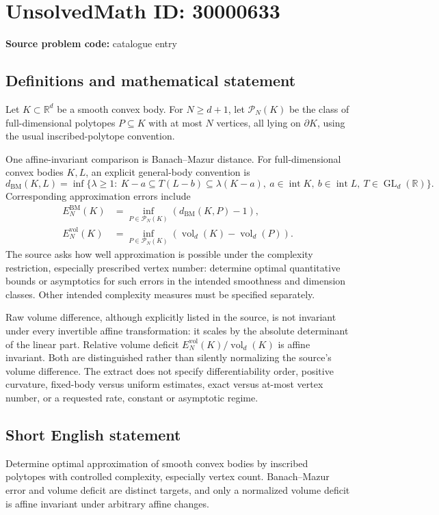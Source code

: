 \documentclass[11pt]{article}
\newcommand{\R}{\mathbb{R}}
\begin{document}
\section*{UnsolvedMath ID: 30000633}
\textbf{Source problem code:} catalogue entry
\subsection{Definitions and mathematical statement}
Let $K\subset\R^d$ be a smooth convex body. For $N\geq d+1$, let $\mathcal P_N(K)$ be the class of full-dimensional polytopes $P\subseteq K$ with at most $N$ vertices, all lying on $\partial K$, using the usual inscribed-polytope convention.

One affine-invariant comparison is Banach--Mazur distance. For full-dimensional convex bodies $K,L$, an explicit general-body convention is
\[
d_{\mathrm{BM}}(K,L)=\inf\{\lambda\geq1:\ K-a\subseteq T(L-b)\subseteq\lambda(K-a),\
 a\in\operatorname{int}K,\ b\in\operatorname{int}L,\ T\in\operatorname{GL}_d(\R)\}.
\]
Corresponding approximation errors include
\[
\begin{aligned}
E_N^{\mathrm{BM}}(K)&=\inf_{P\in\mathcal P_N(K)}(d_{\mathrm{BM}}(K,P)-1),\\
E_N^{\mathrm{vol}}(K)&=\inf_{P\in\mathcal P_N(K)}(\operatorname{vol}_d(K)-\operatorname{vol}_d(P)).
\end{aligned}
\]
The source asks how well approximation is possible under the complexity restriction, especially prescribed vertex number: determine optimal quantitative bounds or asymptotics for such errors in the intended smoothness and dimension classes. Other intended complexity measures must be specified separately.

Raw volume difference, although explicitly listed in the source, is not invariant under every invertible affine transformation: it scales by the absolute determinant of the linear part. Relative volume deficit $E_N^{\mathrm{vol}}(K)/\operatorname{vol}_d(K)$ is affine invariant. Both are distinguished rather than silently normalizing the source's volume difference. The extract does not specify differentiability order, positive curvature, fixed-body versus uniform estimates, exact versus at-most vertex number, or a requested rate, constant or asymptotic regime.
\subsection{Short English statement}
Determine optimal approximation of smooth convex bodies by inscribed polytopes with controlled complexity, especially vertex count. Banach--Mazur error and volume deficit are distinct targets, and only a normalized volume deficit is affine invariant under arbitrary affine changes.
\end{document}

